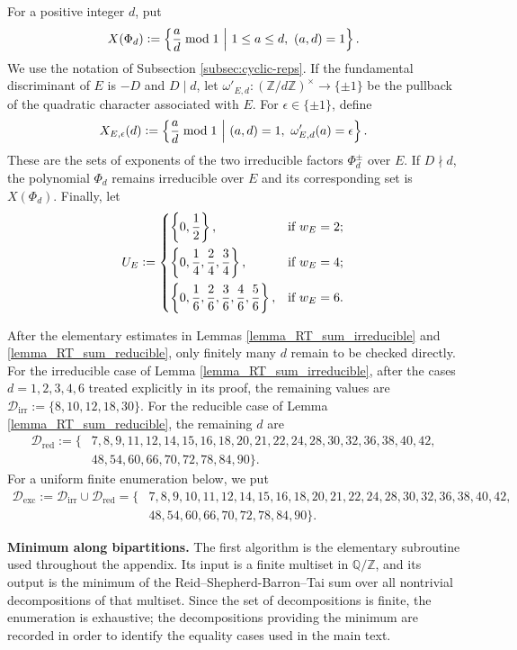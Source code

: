 \documentclass[11pt]{amsart}
\theoremstyle{plain}
\theoremstyle{definition}
\numberwithin{equation}{section}
\newcommand{\bbQ}{\mathbb{Q}}
\newcommand{\bbZ}{\mathbb{Z}}
\newcommand{\defeq}{\vcentcolon=}
\begin{document}
For a positive integer $d$, put
\[
X(\Phi_d)\defeq\left\{\frac{a}{d}\bmod1\ \middle|\ 1\leq a\leq d,\ (a,d)=1\right\}.
\]
We use the notation of Subsection \ref{subsec:cyclic-reps}. If the fundamental discriminant of $E$ is $-D$ and $D\mid d$, let $\omega'_{E,d}:(\bbZ/d\bbZ)^\times\to\{\pm1\}$
be the pullback of the quadratic character associated with $E$. For $\epsilon\in\{\pm1\}$, define
\[
X_{E,\epsilon}(d)\defeq\left\{\frac{a}{d}\bmod1\ \middle|\ (a,d)=1,\ \omega'_{E,d}(a)=\epsilon\right\}.
\]
These are the sets of exponents of the two irreducible factors $\Phi_d^\pm$ over $E$. If $D\nmid d$, the polynomial $\Phi_d$ remains irreducible over $E$ and its corresponding set is $X(\Phi_d)$.
Finally, let
\[
U_E\defeq
\begin{dcases}
\left\{0,\frac{1}{2}\right\}, & \text{if $w_E=2$};\\
\left\{0,\frac{1}{4},\frac{2}{4},\frac{3}{4}\right\}, & \text{if $w_E=4$};\\
\left\{0,\frac{1}{6},\frac{2}{6},\frac{3}{6},\frac{4}{6},\frac{5}{6}\right\}, & \text{if $w_E=6$}.
\end{dcases}
\]

After the elementary estimates in Lemmas
\ref{lemma_RT_sum_irreducible} and \ref{lemma_RT_sum_reducible},
only finitely many $d$ remain to be checked directly.
For the irreducible case of Lemma \ref{lemma_RT_sum_irreducible}, after
the cases $d=1,2,3,4,6$ treated explicitly in its proof, the remaining values are $\mathcal{D}_{\mathrm{irr}}
:=
\{8,10,12,18,30\}$.
For the reducible case of Lemma \ref{lemma_RT_sum_reducible}, the
remaining $d$ are
\[
\begin{split}
\mathcal{D}_{\mathrm{red}}
:=\{&7,8,9,11,12,14,15,16,18,20,21,22,24,28,30,32,36,38,40,42,\\
&48,54,60,66,70,72,78,84,90\}.
\end{split}
\]
For a uniform finite enumeration below, we put
\[
\begin{split}
\mathcal{D}_{\mathrm{exc}}
:=\mathcal{D}_{\mathrm{irr}}\cup\mathcal{D}_{\mathrm{red}}
=\{&7,8,9,10,11,12,14,15,16,18,20,21,22,24,28,30,32,36,38,40,42,\\
&48,54,60,66,70,72,78,84,90\}.
\end{split}
\]

\noindent \textbf{Minimum along bipartitions.}
The first algorithm is the elementary subroutine used throughout the appendix. Its input is a finite multiset in $\bbQ/\bbZ$, and its output is the  minimum of the Reid--Shepherd-Barron--Tai sum over all nontrivial decompositions of that multiset. Since the set of decompositions is finite, the enumeration is exhaustive; the decompositions providing the minimum are recorded in order to identify the equality cases used in the main text.
\end{document}
